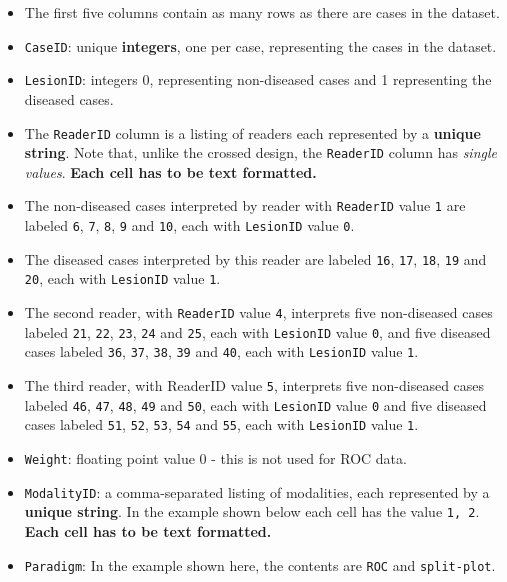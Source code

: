 \documentclass[
]{book}
\providecommand{\tightlist}{%
  \setlength{\itemsep}{0pt}\setlength{\parskip}{0pt}}
\begin{document}
\begin{itemize}
\tightlist
\item
  The first five columns contain as many rows as there are cases in the dataset.
\item
  \texttt{CaseID}: unique \textbf{integers}, one per case, representing the cases in the dataset.
\item
  \texttt{LesionID}: integers 0, representing non-diseased cases and 1 representing the diseased cases.
\item
  The \texttt{ReaderID} column is a listing of readers each represented by a \textbf{unique string}. Note that, unlike the crossed design, the \texttt{ReaderID} column has \emph{single values}. \textbf{Each cell has to be text formatted.}
\item
  The non-diseased cases interpreted by reader with \texttt{ReaderID} value \texttt{1} are labeled \texttt{6}, \texttt{7}, \texttt{8}, \texttt{9} and \texttt{10}, each with \texttt{LesionID} value \texttt{0}.
\item
  The diseased cases interpreted by this reader are labeled \texttt{16}, \texttt{17}, \texttt{18}, \texttt{19} and \texttt{20}, each with \texttt{LesionID} value \texttt{1}.\\
\item
  The second reader, with \texttt{ReaderID} value \texttt{4}, interprets five non-diseased cases labeled \texttt{21}, \texttt{22}, \texttt{23}, \texttt{24} and \texttt{25}, each with \texttt{LesionID} value \texttt{0}, and five diseased cases labeled \texttt{36}, \texttt{37}, \texttt{38}, \texttt{39} and \texttt{40}, each with \texttt{LesionID} value \texttt{1}.\\
\item
  The third reader, with ReaderID value \texttt{5}, interprets five non-diseased cases labeled \texttt{46}, \texttt{47}, \texttt{48}, \texttt{49} and \texttt{50}, each with \texttt{LesionID} value \texttt{0} and five diseased cases labeled \texttt{51}, \texttt{52}, \texttt{53}, \texttt{54} and \texttt{55}, each with \texttt{LesionID} value \texttt{1}.\\
\item
  \texttt{Weight}: floating point value 0 - this is not used for ROC data.\\
\item
  \texttt{ModalityID}: a comma-separated listing of modalities, each represented by a \textbf{unique string}. In the example shown below each cell has the value \texttt{1,\ 2}. \textbf{Each cell has to be text formatted.}
\item
  \texttt{Paradigm}: In the example shown here, the contents are \texttt{ROC} and \texttt{split-plot}.
\end{itemize}
\end{document}
